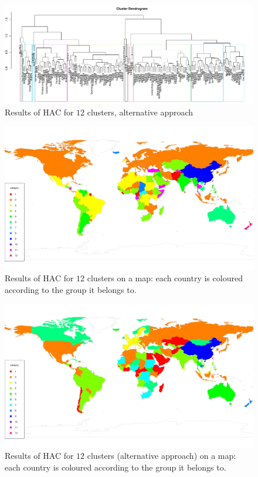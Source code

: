 \documentclass[a4paper,12pt]{article}
\numberwithin{equation}{section}
\begin{document}
\newpage 
\FloatBarrier
\begin{figure}
\includegraphics[width=\textwidth]{plots/dendrogram_alt_12}
\caption{Results of HAC for $12$ clusters, alternative approach}
\end{figure}


\begin{figure}[t!]
\begin{minipage}[t]{0.98\textwidth}
\includegraphics[width=\textwidth]{plots/choropleth_12}
\caption{Results of HAC for $12$ clusters on a map: each country is coloured according to the group it belongs to.}
\end{minipage}
\end{figure}

\begin{figure}[t!]
\begin{minipage}[t]{0.98\textwidth}
\includegraphics[width=\textwidth]{plots/choropleth_alt_12}
\caption{Results of HAC for $12$ clusters (alternative approach) on a map: each country is coloured according to the group it belongs to.}
\end{minipage}
\end{figure}
\end{document}

